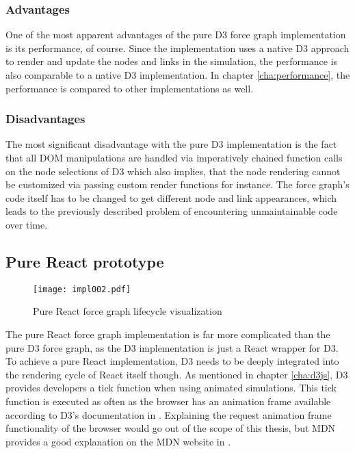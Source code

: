\subsubsection{Advantages}

One of the most apparent advantages of the pure D3 force graph implementation is its performance, of course. Since the implementation uses a native D3 approach to render and update the nodes and links in the simulation, the performance is also comparable to a native D3 implementation. In chapter \ref{cha:performance}, the performance is compared to other implementations as well.

\subsubsection{Disadvantages}

The most significant disadvantage with the pure D3 implementation is the fact that all DOM manipulations are handled via imperatively chained function calls on the node selections of D3 which also implies, that the node rendering cannot be customized via passing custom render functions for instance. The force graph's code itself has to be changed to get different node and link appearances, which leads to the previously described problem of encountering unmaintainable code over time.


\subsection{Pure React prototype}

\begin{figure}
\centering
\texttt{[image: impl002.pdf]}
\caption{Pure React force graph lifecycle visualization}
\label{fig:pureReactLifecycle}
\end{figure}

The pure React force graph implementation is far more complicated than the pure D3 force graph, as the D3 implementation is just a React wrapper for D3. To achieve a pure React implementation, D3 needs to be deeply integrated into the rendering cycle of React itself though. As mentioned in chapter \ref{cha:d3js}, D3 provides developers a tick function when using animated simulations. This tick function is executed as often as the browser has an animation frame available according to D3's documentation in \cite[/d3-timer/blob/master/README.md]{D3Github}. Explaining the request animation frame functionality of the browser would go out of the scope of this thesis, but MDN provides a good explanation on the MDN website in \cite{RAF}.

